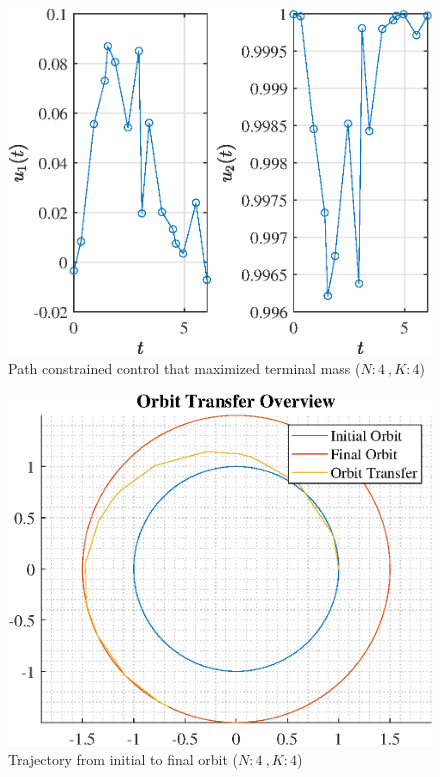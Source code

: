 \documentclass[]{article}
\begin{document}
\begin{figure}
	\centering
	\includegraphics[scale=0.75]{path_N4_K4_C3_mf.eps}
	\caption{Path constrained control that maximized terminal mass (\(N:4\ , K:4\))}
	\label{fig:path_N4_K4_C3_mf}
\end{figure}
\begin{figure}
	\centering
	\includegraphics[scale=0.75]{orbit_N4_K4_C3_mf.eps}
	\caption{Trajectory from initial to final orbit (\(N:4\ , K:4\))}
	\label{fig:orbit_N4_K4_C3_mf}
\end{figure}
\end{document}
